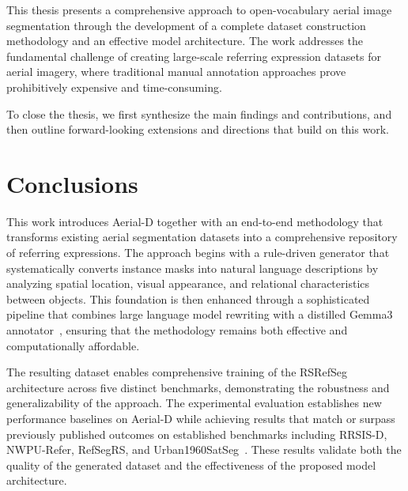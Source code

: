 \cleardoublepage
\label{chap:conclusion}

This thesis presents a comprehensive approach to open-vocabulary aerial image segmentation through the development of a complete dataset construction methodology and an effective model architecture. The work addresses the fundamental challenge of creating large-scale referring expression datasets for aerial imagery, where traditional manual annotation approaches prove prohibitively expensive and time-consuming.

To close the thesis, we first synthesize the main findings and contributions, and then outline forward-looking extensions and directions that build on this work.

\section{Conclusions}

This work introduces Aerial-D together with an end-to-end methodology that transforms existing aerial segmentation datasets into a comprehensive repository of referring expressions. The approach begins with a rule-driven generator that systematically converts instance masks into natural language descriptions by analyzing spatial location, visual appearance, and relational characteristics between objects. This foundation is then enhanced through a sophisticated pipeline that combines large language model rewriting with a distilled Gemma3 annotator~\cite{gemma3}, ensuring that the methodology remains both effective and computationally affordable.

The resulting dataset enables comprehensive training of the RSRefSeg architecture across five distinct benchmarks, demonstrating the robustness and generalizability of the approach. The experimental evaluation establishes new performance baselines on Aerial-D while achieving results that match or surpass previously published outcomes on established benchmarks including RRSIS-D, NWPU-Refer, RefSegRS, and Urban1960SatSeg~\cite{yuan2023rrsis,yang2024large,hao2025urban1960satseg}. These results validate both the quality of the generated dataset and the effectiveness of the proposed model architecture.

